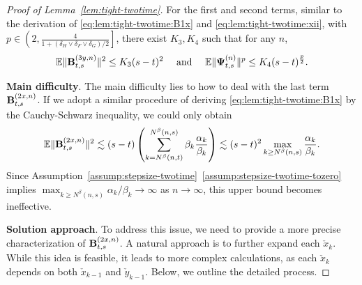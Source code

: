 \documentclass[11pt]{article}
\theoremstyle{plain}
\theoremstyle{definition}
\def\Hsmooth{{\delta_H}}
\def\Fsmooth{{\delta_F}}
\def\Gsmooth{{\delta_G}}
\def\EB{{\mathbb E}}
\newcommand{\xcheck}{{\check{x}}}
\newcommand{\ycheck}{{\check{y}}}
\newcommand{\ssum}[3]{\sum\limits_{{#1}={#2}}^{#3}}
\def\Psii{\mbox{\boldmath$\Psi$\unboldmath}}
\def\bfB{{\bf B}}
\begin{document}
\begin{appendix}
\begin{proof}[Proof of Lemma~\ref{lem:tight-twotime}]
For the first and second terms,
similar to the derivation of \eqref{eq:lem:tight-twotime:B1x} and \eqref{eq:lem:tight-twotime:xii}, with $p \in \left(2, \frac{4}{1 + ( \Hsmooth \vee \Fsmooth \vee \Gsmooth )/2} \right]$, there exist $K_3, K_4$ such that for any $n$,
\begin{align}\label{eq:lem:tight-slow:BandPsi}
    \EB \| \bfB^{(3y,n)}_{t,s} \|^2 \le K_3 (s-t)^2 \quad \text{ and } \quad
    \EB \| \Psii^{(n)}_{t,s} \|^p \le K_4 (s-t)^\frac{p}{2}.
\end{align}

\textbf{Main difficulty}.
The main difficulty lies to how to deal with the last term $ \bfB^{(2x,n)}_{t,s}$.
If we adopt a similar procedure of deriving \eqref{eq:lem:tight-twotime:B1x} by the Cauchy-Schwarz inequality,
we could only obtain 
\[\EB \| \bfB^{(2x,n)}_{t,s} \|^2 \lesssim (s-t)  \left( \ssum{k}{N^\beta(n,t)}{N^\beta(n,s)} \beta_{k} \frac{\alpha_{k} }{\beta_{k}} \right)
\lesssim (s-t)^2 \max_{k \ge N^\beta(n,s)} \frac{\alpha_{k}}{\beta_{k}}.
\] 
Since Assumption~\ref{assump:stepsize-twotime}~\ref{assump:stepsize-twotime-tozero} implies $\max_{k \ge N^\beta(n,s)} \alpha_{k} / \beta_{k} \to \infty$ as $n \to \infty$, this upper bound becomes ineffective.
\vspace{0.2cm}

\textbf{Solution approach}.
To address this issue, we need to provide a more precise characterization of $ \bfB^{(2x,n)}_{t,s}$.
A natural approach is to further expand each $\xcheck_{k}$. While this idea is feasible, it leads to more complex calculations, as each $\xcheck_{k}$ depends on both $\xcheck_{k-1}$ and $\ycheck_{k-1}$. Below, we outline the detailed process.


\end{proof}
\end{appendix}
\end{document}
